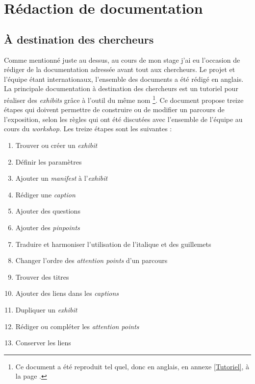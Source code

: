 	\section{Rédaction de documentation}
	\subsection{À destination des chercheurs}
	Comme mentionné juste au dessus, au cours de mon stage j'ai eu l'occasion de rédiger de la documentation adressée avant tout aux chercheurs. Le projet et l'équipe étant internationaux, l'ensemble des documents a été rédigé en anglais. La principale documentation à destination des chercheurs est un tutoriel pour réaliser des \textit{exhibits} grâce à l'outil du même nom \footnote{Ce document a été reproduit tel quel, donc en anglais, en annexe \ref{Tutoriel}, à la page \pageref{Tutoriel}.}. Ce document propose treize étapes qui doivent permettre de construire ou de modifier un parcours de l'exposition, selon les règles qui ont été discutées avec l'ensemble de l'équipe au cours du \textit{workshop}. Les treize étapes sont les suivantes : 
	\begin{enumerate}
    \item Trouver ou créer un \textit{exhibit}
    \item Définir les paramètres
    \item Ajouter un \textit{manifest} à l'\textit{exhibit}
    \item Rédiger une \textit{caption}
    \item Ajouter des questions
    \item Ajouter des \textit{pinpoints}
    \item Traduire et harmoniser l'utilisation de l'italique et des guillemets 
    \item Changer l'ordre des \textit{attention points} d'un parcours
    \item Trouver des titres
    \item Ajouter des liens dans les \textit{captions}
    \item Dupliquer un \textit{exhibit}
    \item Rédiger ou compléter les \textit{attention points}
    \item Conserver les liens 
    \end{enumerate}

